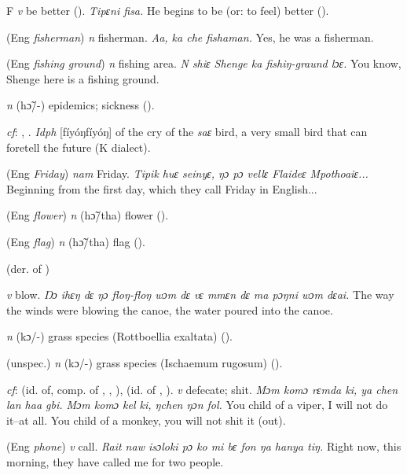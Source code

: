 \begin{letter}{F}
 \textit{v} be better (\citealt{Pichl1967}). \textit{Tipɛni fisa.} He begins to be (or: to feel) better (\citealt{Pichl1967}).

 (Eng \textit{fisherman}) \textit{n} fisherman. \textit{Aa, ka che fishaman.} Yes, he was a fisherman.

 (Eng \textit{fishing ground}) \textit{n} fishing area. \textit{N shiɛ Shenge ka fishiŋ-graund lɔɛ.} You know, Shenge here is a fishing ground.

 \textit{n} (hɔ̃/-) epidemics; sickness (\citealt{Pichl1967}). 

 \textit{cf}: , . \textit{Idph} [fíyóŋfíyóŋ] of the cry of the \textit{saɛ} bird, a very small bird that can foretell the future (K dialect).

 (Eng \textit{Friday}) \textit{nam} Friday. \textit{Tipik huɛ seinyɛ, ŋɔ pɔ vellɛ Flaideɛ Mpothoaiɛ...} Beginning from the first day, which they call Friday in English...

 (Eng \textit{flower}) \textit{n} (hɔ̃/tha) flower (\citealt{Pichl1967}).

 (Eng \textit{flag}) \textit{n} (hɔ̃/tha) flag (\citealt{Pichl1967}).

 (der. of ) 

 \textit{v} blow. \textit{Ŋɔ ihɛŋ dɛ ŋɔ floŋ-floŋ wɔm dɛ vɛ mmɛn dɛ ma pɔŋni wɔm dɛai.} The way the winds were blowing the canoe, the water poured into the canoe. 

 \textit{n} (kɔ/-) grass species (Rottboellia exaltata) (\citealt{Pichl1967}). 

 (unspec.) \textit{n} (kɔ/-) grass species (Ischaemum rugosum) (\citealt{Pichl1967}). 

 \textit{cf}:  (id. of, comp. of , , ),  (id. of , ). \textit{v} defecate; shit. \textit{Mɔm komɔ rɛmda ki, ya chen lan haa gbi. Mɔm komɔ kel ki, ŋchen ŋɔn fol.} You child of a viper, I will not do it--at all. You child of a monkey, you will not shit it (out). 

 (Eng \textit{phone}) \textit{v} call. \textit{Rait naw isɔloki pɔ ko mi bɛ fon ŋa hanya tiŋ.} Right now, this morning, they have called me for two people.


\end{letter}
